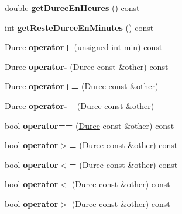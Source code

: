 \begin{DoxyCompactItemize}
\item 
\hypertarget{class_duree_acaf629d6df6668a2c2d9a7f5bffeb9e1}{}double {\bfseries get\+Duree\+En\+Heures} () const \label{class_duree_acaf629d6df6668a2c2d9a7f5bffeb9e1}

\item 
\hypertarget{class_duree_a3a6bfde3c641f15c68ac4f88303ce275}{}int {\bfseries get\+Reste\+Duree\+En\+Minutes} () const \label{class_duree_a3a6bfde3c641f15c68ac4f88303ce275}

\item 
\hypertarget{class_duree_aa44bd9ae4f27fe00204543feeaefe2ca}{}\hyperlink{class_duree}{Duree} {\bfseries operator+} (unsigned int min) const \label{class_duree_aa44bd9ae4f27fe00204543feeaefe2ca}

\item 
\hypertarget{class_duree_adf484fa269dc25a6247cd25795bd72ea}{}\hyperlink{class_duree}{Duree} {\bfseries operator-\/} (\hyperlink{class_duree}{Duree} const \&other) const \label{class_duree_adf484fa269dc25a6247cd25795bd72ea}

\item 
\hypertarget{class_duree_a9866be4c92f15c2c5ddd0ccdaab566df}{}\hyperlink{class_duree}{Duree} {\bfseries operator+=} (\hyperlink{class_duree}{Duree} const \&other)\label{class_duree_a9866be4c92f15c2c5ddd0ccdaab566df}

\item 
\hypertarget{class_duree_a243ef035ea34f4c6e34f928b8e9924ab}{}\hyperlink{class_duree}{Duree} {\bfseries operator-\/=} (\hyperlink{class_duree}{Duree} const \&other)\label{class_duree_a243ef035ea34f4c6e34f928b8e9924ab}

\item 
\hypertarget{class_duree_a230a64859fa89a4d3c983d96af0a5925}{}bool {\bfseries operator==} (\hyperlink{class_duree}{Duree} const \&other) const \label{class_duree_a230a64859fa89a4d3c983d96af0a5925}

\item 
\hypertarget{class_duree_a91e334a82cec62fd43e4c80db0acfe13}{}bool {\bfseries operator$>$=} (\hyperlink{class_duree}{Duree} const \&other) const \label{class_duree_a91e334a82cec62fd43e4c80db0acfe13}

\item 
\hypertarget{class_duree_ae82a6ed05f23dde893b83b5f31dd20a2}{}bool {\bfseries operator$<$=} (\hyperlink{class_duree}{Duree} const \&other) const \label{class_duree_ae82a6ed05f23dde893b83b5f31dd20a2}

\item 
\hypertarget{class_duree_a2dc45a74a26a1fd35605aca6b321208b}{}bool {\bfseries operator$<$} (\hyperlink{class_duree}{Duree} const \&other) const \label{class_duree_a2dc45a74a26a1fd35605aca6b321208b}

\item 
\hypertarget{class_duree_ad76fa253fe864da9713fefc77f12e181}{}bool {\bfseries operator$>$} (\hyperlink{class_duree}{Duree} const \&other) const \label{class_duree_ad76fa253fe864da9713fefc77f12e181}

\end{DoxyCompactItemize}
